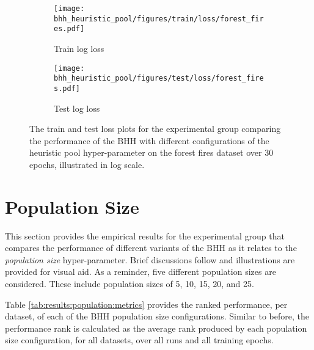 \begin{figure}[htbp]
	\begin{subfigure}{0.5\textwidth}
		\centering
		\texttt{[image: bhh\_heuristic\_pool/figures/train/loss/forest\_fires.pdf]}
		\caption{Train log loss}
		\label{fig:results:heuristic_pool:figures:loss:train:forest_fires}
	\end{subfigure}
	\begin{subfigure}{0.5\textwidth}
		\centering
		\texttt{[image: bhh\_heuristic\_pool/figures/test/loss/forest\_fires.pdf]}
		\caption{Test log loss}
		\label{fig:results:heuristic_pool:figures:loss:test:forest_fires}
	\end{subfigure}
	\par\bigskip
	\caption{The train and test loss plots for the experimental group comparing the performance of the \acs{BHH} with different configurations of the heuristic pool hyper-parameter on the forest fires dataset over 30 epochs, illustrated in log scale.}
	\label{fig:results:heuristic_pool:figures:forest_fires}
\end{figure}



\section{Population Size}\label{sec:results:population}

This section provides the empirical results for the experimental group that compares the performance of different variants of the \acs{BHH} as it relates to the \textit{population size} hyper-parameter. Brief discussions follow and illustrations are provided for visual aid. As a reminder, five different population sizes are considered. These include population sizes of 5, 10, 15, 20, and 25.

Table \ref{tab:results:population:metrics} provides the ranked performance, per dataset, of each of the \acs{BHH} population size configurations. Similar to before, the performance rank is calculated as the average rank produced by each population size configuration, for all datasets, over all runs and all training epochs.

